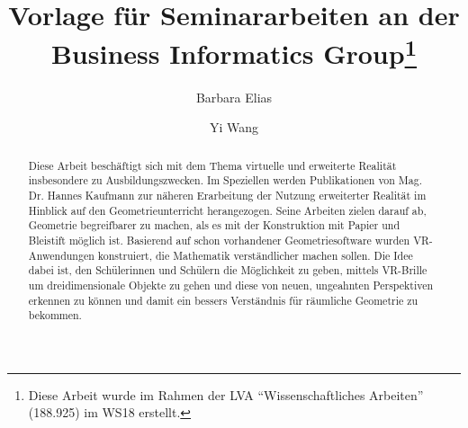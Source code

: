 \documentclass[deutsch]{llncs}
\begin{document}
\def\abstractname{Kurzfassung.}

\pagestyle{plain}

\title{Vorlage für Seminararbeiten an der Business Informatics Group\thanks{Diese Arbeit wurde im Rahmen der LVA ``Wissenschaftliches Arbeiten'' (188.925) im WS18 erstellt.}}




\author{Barbara Elias \and Yi Wang}


\maketitle


\begin{abstract}
Diese Arbeit beschäftigt sich mit dem Thema virtuelle und erweiterte Realität insbesondere zu Ausbildungszwecken. Im Speziellen werden Publikationen von Mag. Dr. Hannes Kaufmann zur näheren Erarbeitung der Nutzung erweiterter Realität im Hinblick auf den Geometrieunterricht herangezogen. Seine Arbeiten zielen darauf ab, Geometrie begreifbarer zu machen, als es mit der Konstruktion mit Papier und Bleistift möglich ist. Basierend auf schon vorhandener Geometriesoftware wurden VR-Anwendungen konstruiert, die Mathematik verständlicher machen sollen. Die Idee dabei ist, den Schülerinnen und Schülern die Möglichkeit zu geben, mittels VR-Brille um dreidimensionale Objekte zu gehen und diese von neuen, ungeahnten Perspektiven erkennen zu können und damit ein bessers Verständnis für räumliche Geometrie zu bekommen.
\end{abstract}
\end{document}

